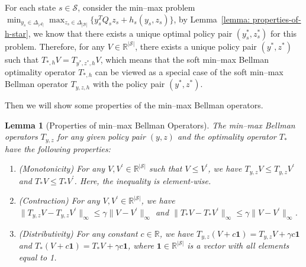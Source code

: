\documentclass{article}
\theoremstyle{plain}
\newtheorem{lemma}{Lemma}
\theoremstyle{definition}
\theoremstyle{remark}
\def\cA{\mathcal A}
\def\cB{\mathcal B}
\begin{document}
For each state $s\in \mathcal{S}$, consider the min--max problem $\min_{y_s \in \Delta_{|\cA|}} \max_{z_s \in \Delta_{|\cB|}} \{y_s^T Q_s z_s + h_s(y_s,z_s)\}$, by Lemma~\ref{lemma: properties-of-h-star}, we know that there exists a unique optimal policy pair $(y_s^*, z_s^*)$ for this problem. Therefore, for any $V \in \mathbb{R}^{|\mathcal{S}|}$, there exists a unique policy pair $(y^*, z^*)$ such that $T_{*,h} V = T_{y^*,z^*,h} V$, which means that the soft min--max Bellman optimality operator $T_{*,h}$ can be viewed as a special case of the soft min--max Bellman operator $T_{y,z,h}$ with the policy pair $(y^*, z^*)$.

Then we will show some properties of the min--max Bellman operators.
\begin{lemma}[Properties of min--max Bellman Operators]
    \label{lemma: min-max-bellman-operator-properties}
    The min--max Bellman operators $T_{y,z}$ for any given policy pair $(y,z)$ and the optimality operator $T_{*}$ have the following properties:
    \begin{enumerate}[label=\roman*.]
        \item (Monotonicity) For any $V, V^\prime \in \mathbb{R}^{|\mathcal{S}|}$ such that $V \le V^\prime$, we have $T_{y,z} V \le T_{y,z} V^\prime$ and $T_{*} V \le T_{*} V^\prime$. Here, the inequality is element-wise.
        \item (Contraction) For any $V, V^\prime \in \mathbb{R}^{|\mathcal{S}|}$, we have $\|T_{y,z} V - T_{y,z} V^\prime\|_\infty \le \gamma \| V - V^\prime \|_\infty$ and $\|T_{*} V - T_{*} V^\prime\|_\infty \le \gamma \| V - V^\prime \|_\infty$.
        \item (Distributivity) For any constant $c \in \mathbb{R}$, we have $T_{y,z} (V + c \mathbf{1}) = T_{y,z} V + \gamma c \mathbf{1}$ and $T_{*} (V + c \mathbf{1}) = T_{*} V + \gamma c \mathbf{1}$, where $\mathbf{1} \in \mathbb{R}^{|\mathcal{S}|}$ is a vector with all elements equal to 1.
    \end{enumerate}
\end{lemma}
\end{document}
